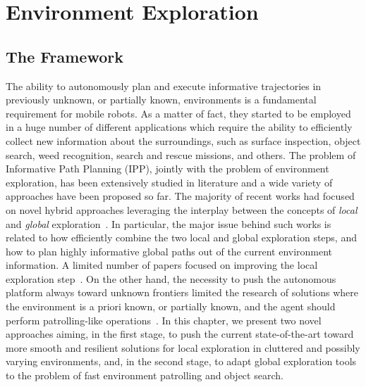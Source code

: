 \chapter{Environment Exploration}%
\label{CH:EXPLORATION}

\section{The Framework}%
\label{SEC:EXPLORATION-FRAMEWORK}
The ability to autonomously plan and execute informative trajectories in previously unknown, or partially known,
environments is a fundamental requirement for mobile robots. As a matter of fact, they started to be employed
in a huge number of different applications which require the ability to efficiently collect new information
about the surroundings, such as surface inspection, object search, weed recognition, search and rescue missions, and others.
The problem of Informative Path Planning (IPP), jointly with the problem of environment exploration, has been extensively
studied in literature and a wide variety of approaches have been proposed so far. The majority of recent works had
focused on novel hybrid approaches leveraging the interplay between the concepts of \emph{local} and \emph{global}
exploration~\cite{selin2019efficient,schmid2020efficient}. In particular, the major issue behind such works is related
to how efficiently combine the two local and global exploration steps, and how to plan highly informative global
paths out of the current environment information. A limited number of papers focused on improving the local exploration
step~\cite{selin2019efficient}. On the other hand, the necessity to push the autonomous platform always toward unknown
frontiers limited the research of solutions where the environment is a priori known, or partially known, and the agent
should perform patrolling-like operations~\cite{dang2018autonomous}. In this chapter, we present two novel approaches
aiming, in the first stage, to push the current state-of-the-art toward more smooth and resilient solutions for local
exploration in cluttered and possibly varying environments, and, in the second stage, to adapt global exploration tools
to the problem of fast environment patrolling and object search.

